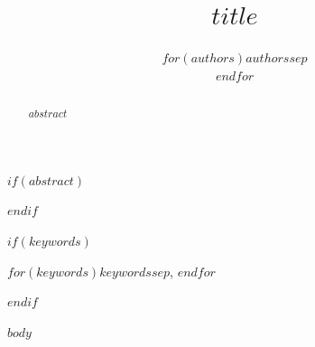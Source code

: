 \documentclass[conference]{IEEEtran}
\title{$title$}
\author{$for(authors)$$authors$$sep$ \\ $endfor$}
\begin{document}
\maketitle

$if(abstract)$
\begin{abstract}
$abstract$
\end{abstract}
$endif$

$if(keywords)$
\begin{IEEEkeywords}
$for(keywords)$$keywords$$sep$, $endfor$
\end{IEEEkeywords}
$endif$

$body$
\end{document}
